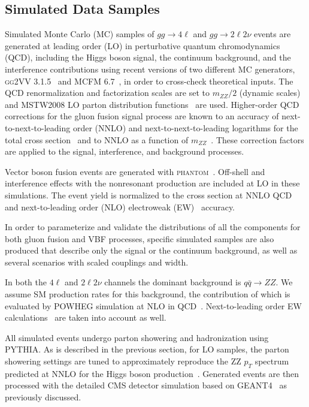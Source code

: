 \subsection{Simulated Data Samples}

Simulated Monte Carlo (MC) samples of $gg \to 4\ell$ and $gg \to 2\ell 2\nu$ events are
generated at leading order (LO) in perturbative quantum chromodynamics (QCD), including the Higgs
boson signal, the continuum background, and the interference contributions using recent versions of
two different MC generators, \textsc{gg2VV} 3.1.5~\cite{Kauer:2012hd,Kauer:2013qba} and
\textsc{MCFM 6.7}~\cite{Campbell:2010ff}, in order to cross-check theoretical inputs. The QCD renormalization
and factorization scales are set to $m_{ZZ}/2$ (dynamic scales) and \textsc{MSTW2008} LO parton distribution
functions~\cite{Martin:2009iq} are used. Higher-order QCD corrections for the gluon fusion signal process
are known to an accuracy of next-to-next-to-leading order (NNLO) and next-to-next-to-leading logarithms
for the total cross section~\cite{Dittmaier:2011ti,Heinemeyer:2013tqa} and to
NNLO as a function of $m_{ZZ}$~\cite{Passarino:2013bha}.
These correction factors are applied to the signal, interference, and background processes.

Vector boson fusion events are generated with \textsc{phantom}~\cite{Ballestrero:2007xq}.
Off-shell and interference effects with the nonresonant production are included at LO in these simulations.
The event yield is normalized to the cross section at NNLO QCD and next-to-leading order (NLO)
electroweak (EW)~\cite{Dittmaier:2011ti,Heinemeyer:2013tqa} accuracy.

In order to parameterize and validate the distributions of all the components for both gluon fusion and
VBF processes, specific simulated samples are also produced that describe only the signal or the continuum background,
as well as several scenarios with scaled couplings and width.

In both the $4\ell$ and $2\ell2\nu$ channels the dominant background is $q\bar{q} \to ZZ$.
We assume SM production rates for this background, the contribution of which is evaluated by \textsc{POWHEG}
simulation at NLO in QCD~\cite{Melia:2011tj}. Next-to-leading order EW calculations~\cite{Bierweiler:2013dja,Baglio:2013toa} are taken into account as well.

All simulated events undergo parton showering and hadronization using \textsc{PYTHIA}.
As is described in the previous section, for LO samples, the parton showering settings
are tuned to approximately reproduce the ZZ $p_{T}$ spectrum predicted at NNLO for the Higgs boson
production~\cite{deFlorian:2012mx}. Generated events are then processed with the detailed CMS detector simulation
based on \textsc{GEANT4}~\cite{Allison:2006ve,Agostinelli2003250} as previously discussed.

